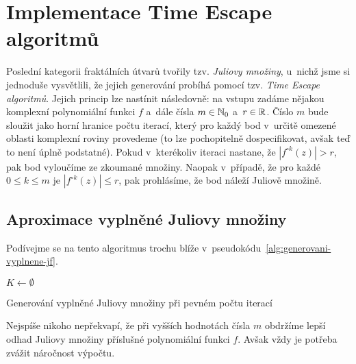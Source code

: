\section{Implementace Time Escape algoritmů}\label{sec:implementace-tea}

Poslední kategorii fraktálních útvarů tvořily tzv. \emph{Juliovy množiny}, u~nichž jsme si jednoduše vysvětlili, že jejich generování probíhá pomocí tzv. \emph{Time Escape algoritmů}. Jejich princip lze nastínit následovně: na vstupu zadáme nějakou komplexní polynomiální funkci $f$ a~dále čísla $m\in\mathbb{N}_0$ a~$r\in\mathbb{R}$. Číslo $m$ bude sloužit jako horní hranice počtu iterací, který pro každý bod v~určitě omezené oblasti komplexní roviny provedeme (to lze pochopitelně dospecifikovat, avšak teď to není úplně podstatné). Pokud v~kterékoliv iteraci nastane, že $|f^{\circ k}(z)|>r$, pak bod vyloučíme ze zkoumané množiny. Naopak v~případě, že pro každé $0\leqslant k\leqslant m$ je $|f^{\circ k}(z)|\leqslant r$, pak prohlásíme, že bod náleží Juliově množině.

\subsection{Aproximace vyplněné Juliovy množiny}\label{subsec:aproximace-vyplnene-juliovy-mnoziny}

Podívejme se na tento algoritmus trochu blíže v~pseudokódu~\ref{alg:generovani-vyplnene-jf}.
\begin{algorithm}
    $K\gets\emptyset$\;
    \;
    \caption{Generování vyplněné Juliovy množiny při pevném počtu iterací}
    \label{alg:generovani-vyplnene-jf}
\end{algorithm}
Nejspíše nikoho nepřekvapí, že při vyšších hodnotách čísla $m$ obdržíme lepší odhad Juliovy množiny příslušné polynomiální funkci $f$. Avšak vždy je potřeba zvážit náročnost výpočtu.


